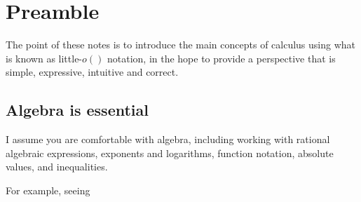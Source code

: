 \documentclass{tufte-book} %
\begin{document}

\tableofcontents %


\listoffigures %


\listoftables %



\cleardoublepage
\chapter*{Preamble}
The point of these notes is to introduce the main concepts of calculus using what is known as little-$o()$ notation, in the hope to provide a perspective that is simple, expressive, intuitive and correct.

\section*{Algebra is essential}
I assume you are comfortable with algebra, including working with rational algebraic expressions, exponents and logarithms, function notation, absolute values, and inequalities.

For example, seeing 
\end{document}
